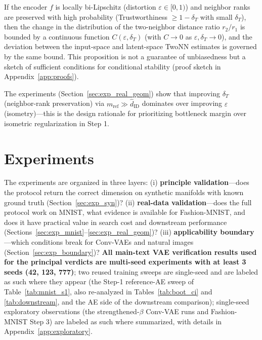 \documentclass[make,article,submit,pdftex,moreauthors]{Definitions/mdpi}
\newcommand{\hatdID}{\hat{d}_{\mathrm{ID}}}
\begin{document}
\begin{Proposition}\label{thm:twonn_stability}
If the encoder $f$ is locally bi-Lipschitz (distortion
$\varepsilon \in [0,1)$) and neighbor ranks are preserved with high
probability (Trustworthiness $\geq 1 - \delta_T$ with small $\delta_T$),
then the change in the distribution of the two-neighbor distance ratio
$r_2/r_1$ is bounded by a continuous function $C(\varepsilon, \delta_T)$
(with $C \to 0$ as $\varepsilon, \delta_T \to 0$), and the deviation between
the input-space and latent-space TwoNN estimates is governed by the same
bound.
This proposition is not a guarantee of unbiasedness but a sketch of
sufficient conditions for conditional stability (proof sketch in
Appendix~\ref{app:proofs}).
\end{Proposition}

The experiments (Section~\ref{sec:exp_real_geom}) show that improving
$\delta_T$ (neighbor-rank preservation) via $m_{\mathrm{ref}} \gg \hatdID$
dominates over improving $\varepsilon$ (isometry)---this is the design
rationale for prioritizing bottleneck margin over isometric regularization
in Step 1.

\section{Experiments}\label{sec:exp}

The experiments are organized in three layers:
(i) \textbf{principle validation}---does the protocol return the correct
dimension on synthetic manifolds with known ground truth
(Section~\ref{sec:exp_syn})?
(ii) \textbf{real-data validation}---does the full protocol work on MNIST,
what evidence is available for Fashion-MNIST, and does it have practical
value in search cost and downstream performance
(Sections~\ref{sec:exp_mnist}--\ref{sec:exp_real_geom})?
(iii) \textbf{applicability boundary}---which conditions break for
Conv-VAEs and natural images (Section~\ref{sec:exp_boundary})?
\textbf{All main-text VAE verification results used for the principal
verdicts are multi-seed experiments with at least 3 seeds (42, 123, 777)};
two reused training sweeps are single-seed and are labeled as such where
they appear (the Step-1 reference-AE sweep of Table~\ref{tab:mnist_s1},
also re-analyzed in Tables~\ref{tab:boot_ci} and \ref{tab:downstream}, and
the AE side of the downstream comparison); single-seed exploratory
observations (the strengthened-$\beta$ Conv-VAE runs and Fashion-MNIST
Step 3) are labeled as such where summarized, with details in
Appendix~\ref{app:exploratory}.
\end{document}
